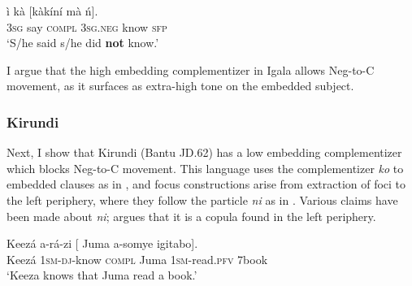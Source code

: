 \documentclass[output=paper,colorlinks,citecolor=brown,
]{langscibook}
\begin{document}
\ea \label{igalaemb}
    \gll \`{i}  k\`{a} [k\`{a}k\'{i}n\'{i}   m\`{a} \'{n}].\\
        \textsc{3sg}   say   \textsc{compl}    \textsc{3sg}.\textsc{neg}  know   \textsc{sfp} \\
       \glt `S/he said s/he did \textbf{not} know.'
\z

I argue that the high embedding complementizer in Igala allows Neg-to-C movement, as it surfaces as extra-high tone on the embedded subject.


\subsubsection{Kirundi}

Next, I show that Kirundi (Bantu JD.62) has a low embedding complementizer which blocks Neg-to-C movement. This language uses the complementizer \textit{ko} to embedded clauses as in , and focus constructions arise from extraction of foci to the left periphery, where they follow the particle \textit{ni} as in . Various claims have been made about \textit{ni}; \citet{terrance} argues that it is a copula found in the left periphery. 
  

\ea \label{kiremb}
\gll Keez\'{a} a-r\'{a}-zi [ Juma a-somye igitabo].\\
    Keez\'{a} 1\textsc{sm}-\textsc{dj}-know \textsc{compl} Juma 1\textsc{sm}-read.{\textsc{pfv}} 7book \\
    \glt `Keeza knows that Juma read a book.’
\z
\end{document}
